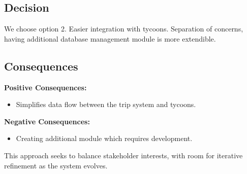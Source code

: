 \subsection*{Decision}
We choose option 2.
Easier integration with tycoons.
Separation of concerns, having additional database management module is more extendible.

\subsection*{Consequences}
\textbf{Positive Consequences:}
\begin{itemize}
\item Simplifies data flow between the trip system and tycoons.
\end{itemize}
\textbf{Negative Consequences:}
\begin{itemize}
\item Creating additional module which requires development.
\end{itemize}
This approach seeks to balance stakeholder interests, with room for iterative refinement as the system evolves.
